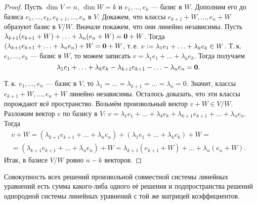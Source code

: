 \begin{proof}
    Пусть $\dim V = n$, $\dim W = k$ и $e_1, \ldots, e_k$ --- базис в $W$. Дополним его до базиса $e_1, \ldots, e_k, e_{k + 1}, \ldots, e_n$ в $V$. Докажем, что классы $e_{k + 1} + W, \ldots, e_n + W$ образуют базис в $V / W$. Вначале покажем, что они линейно независимы. Пусть $\lambda_{k + 1}(e_{k + 1} + W) + \ldots + \lambda_n(e_n + W) = \boldsymbol{0} + W$. Тогда $(\lambda_{k + 1}e_{k + 1} + \ldots + \lambda_ne_n) + W = \boldsymbol{0} + W$, т.\,е. $v \vcentcolon = \lambda_1e_1 + \ldots + \lambda_ke_k \in W$. Т.\,к. $e_1, \ldots, e_k$ --- базис в $W$, то можем записать $v = \lambda_1e_1 + \ldots + \lambda_ke_k$. Тогда получаем
    \[
        \lambda_1e_1 + \ldots + \lambda_ke_k - \lambda_{k + 1}e_{k + 1} - \ldots - \lambda_ne_n = \boldsymbol{0}.
    \]

    Т.\,к. $e_1, \ldots, e_n$ --- базис в $V$, то $\lambda_1 = \ldots = \lambda_{k + 1} = \ldots = \lambda_n = 0$. Значит, классы $e_{k + 1} + W, \ldots, e_n + W$ линейно независимы. Осталось доказать, что эти классы порождают всё пространство. Возьмём произвольный вектор $v + W \in V / W$. Разложим вектор $v$ по базису в $V$: $v = \lambda_1e_1 + \ldots + \lambda_ke_k + \lambda_{k + 1}e_{k + 1} + \ldots + \lambda_ne_n$. Тогда
    \begin{multline*}
        v + W = (\lambda_{k + 1}e_{k + 1} + \ldots + \lambda_ne_n) + (\lambda_1e_1 + \ldots + \lambda_ke_k) + W =\\ = (\lambda_{k + 1}e_{k + 1} + \ldots + \lambda_ne_n) + W = \lambda_{k + 1}(e_{k + 1} + W) + \ldots + \lambda_n(e_n + W).
    \end{multline*}
    Итак, в базисе $V / W$ ровно $n - k$ векторов.
\end{proof}

\begin{proposal}
    Совокупность всех решений произвольной совместной системы линейных уравнений есть сумма какого-либа одного её решения и подпространства решений однородной системы линейных уравнений с той же матрицей коэффициентов.
\end{proposal}

